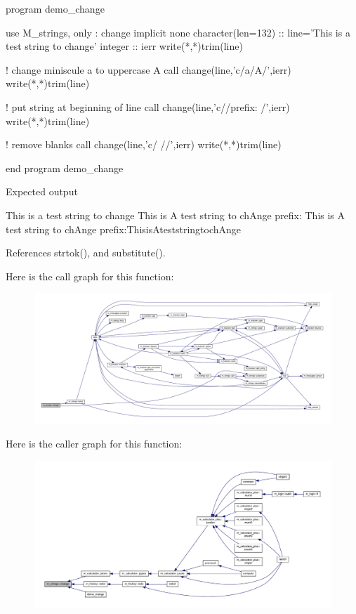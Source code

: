 \begin{DoxyVerb}program demo_change

 use M_strings, only : change
 implicit none
 character(len=132) :: line='This is a test string to change'
 integer            :: ierr
    write(*,*)trim(line)

    ! change miniscule a to uppercase A
    call change(line,'c/a/A/',ierr)
    write(*,*)trim(line)

    ! put string at beginning of line
    call change(line,'c//prefix: /',ierr)
    write(*,*)trim(line)

    ! remove blanks
    call change(line,'c/ //',ierr)
    write(*,*)trim(line)

end program demo_change

Expected output

 This is a test string to change
 This is A test string to chAnge
 prefix: This is A test string to chAnge
 prefix:ThisisAteststringtochAnge \end{DoxyVerb}
 

References strtok(), and substitute().

Here is the call graph for this function\+:
\nopagebreak
\begin{figure}[H]
\begin{center}
\leavevmode
\includegraphics[width=350pt]{namespacem__strings_a1222f3b718f7637105bde330367925e1_cgraph}
\end{center}
\end{figure}
Here is the caller graph for this function\+:
\nopagebreak
\begin{figure}[H]
\begin{center}
\leavevmode
\includegraphics[width=350pt]{namespacem__strings_a1222f3b718f7637105bde330367925e1_icgraph}
\end{center}
\end{figure}
\mbox{\label{namespacem__strings_aa3fc15a665eeff512b7f5269029f558d}} 
